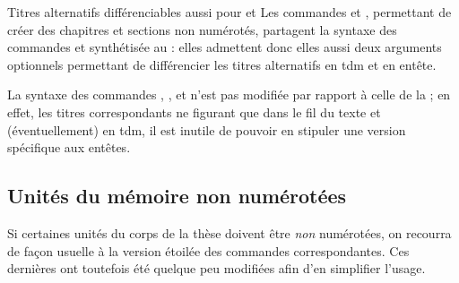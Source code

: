 %
\begin{dbremark}{Titres alternatifs différenciables aussi pour
    \protect{} et \protect{}%
  }{}
  Les commandes  et , permettant
  de créer des chapitres et sections non numérotés, partagent la syntaxe des
  commandes  et  synthétisée au
   : elles admettent donc elles aussi deux
  arguments optionnels permettant de différencier les titres alternatifs
  en \gls{tdm}\signet{} et en entête.
\end{dbremark}
%
La syntaxe des commandes ,
,  et
 n'est pas modifiée par rapport à celle de la
 ; en effet, les titres correspondants ne figurant que dans le fil
du texte et (éventuellement) en \gls{tdm}\signet{}, il est inutile de pouvoir en
stipuler une version spécifique aux entêtes.
%
\subsection{Unités du mémoire non numérotées}
\label{sec-chap-non-numer}%
%


Si certaines unités du corps de la thèse  doivent être \emph{non}
numérotées, on recourra de façon usuelle à la version étoilée des commandes
correspondantes. Ces dernières ont toutefois été quelque peu modifiées afin d'en
simplifier l'usage.


